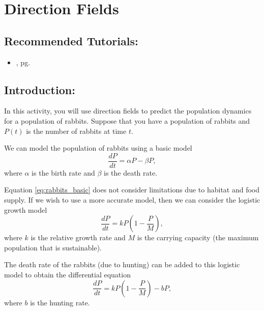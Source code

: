 \section{Direction Fields}
\label{sec:direction_fields}	

\subsection*{Recommended Tutorials:}
\begin{itemize}[noitemsep]
	\item {}, pg. \pageref{chp:differential_equations}
\end{itemize}

\subsection*{Introduction:}
In this activity, you will use direction fields to predict the population dynamics for a population of rabbits. Suppose that you have a population of rabbits and $P(t)$ is the number of rabbits at time $t$. 


We can model the population of rabbits using a basic model
\begin{equation}
\label{eq:rabbits_basic}
\frac{dP}{dt}=\alpha P - \beta P,
\end{equation}
where $\alpha$ is the birth rate and $\beta$ is the death rate.

Equation \eqref{eq:rabbits_basic} does not consider limitations due to habitat and food supply. If we wish to use a more accurate model, then we can consider the logistic growth model
\begin{equation}
\label{eq:rabbits_logistic}
\frac{dP}{dt}= kP \left(1-\frac{P}{M}\right),
\end{equation}
where $k$ is the relative growth rate and $M$ is the carrying capacity (the maximum population that is sustainable). 

The death rate of the rabbits (due to hunting) can be added to this logistic model to obtain the differential equation
\begin{equation}
\label{eq:rabbits_logistic_hunted}
\frac{dP}{dt}=kP \left(1-\frac{P}{M}\right)-bP,
\end{equation}
where $b$ is the hunting rate. 

